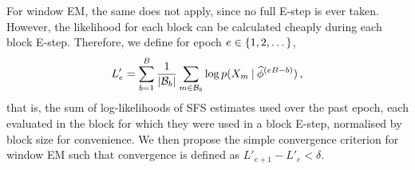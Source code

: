 For window EM, the same does not apply, since no full E-step is ever taken.
However, the likelihood for each block can be calculated cheaply during each block E-step.
Therefore, we define for epoch $e \in \{1, 2, \dots\}$,
%
\begin{equation}\label{eq:windowstop}
    L'_{e}
    =
    \sum_{b = 1}^{\blocks} 
        \frac{1}{\size{\blockset[b]}}
        \sum_{m \in \blockset[b]}
        \log \prob(\data[m] \given \estsfs[e\blocks - b])
    \, ,
\end{equation}
%
that is, the sum of log-likelihoods of SFS estimates used over the past epoch, each evaluated in the block for which they were used in a block E-step, normalised by block size for convenience.
We then propose the simple convergence criterion for window EM such that convergence is defined as $L'_{e + 1} - L'_{e} < \delta$.